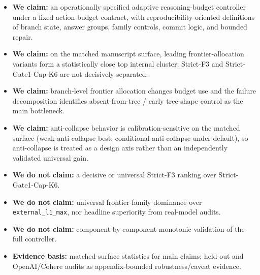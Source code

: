 \begin{itemize}
    \item \textbf{We claim:} an operationally specified adaptive reasoning-budget controller under a fixed action-budget contract, with reproducibility-oriented definitions of branch state, answer groups, family controls, commit logic, and bounded repair.
    \item \textbf{We claim:} on the matched manuscript surface, leading frontier-allocation variants form a statistically close top internal cluster; Strict-F3 and Strict-Gate1-Cap-K6 are not decisively separated.
    \item \textbf{We claim:} branch-level frontier allocation changes budget use and the failure decomposition identifies absent-from-tree / early tree-shape control as the main bottleneck.
    \item \textbf{We claim:} anti-collapse behavior is calibration-sensitive on the matched surface (weak anti-collapse best; conditional anti-collapse under default), so anti-collapse is treated as a design axis rather than an independently validated universal gain.
    \item \textbf{We do not claim:} a decisive or universal Strict-F3 ranking over Strict-Gate1-Cap-K6.
    \item \textbf{We do not claim:} universal frontier-family dominance over \texttt{external\_l1\_max}, nor headline superiority from real-model audits.
    \item \textbf{We do not claim:} component-by-component monotonic validation of the full controller.
    \item \textbf{Evidence basis:} matched-surface statistics for main claims; held-out and OpenAI/Cohere audits as appendix-bounded robustness/caveat evidence.
\end{itemize}
